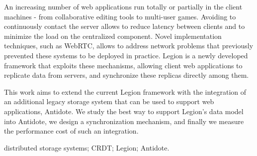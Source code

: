 An increasing number of web applications run totally or partially in the client machines - from collaborative editing tools to multi-user games. Avoiding to continuously contact the server allows to reduce latency between clients and to minimize the load on the centralized component. Novel implementation techniques, such as WebRTC, allows to address network problems that previously prevented these systems to be deployed in practice. Legion is a newly developed framework that exploits these mechanisms, allowing client web applications to replicate data from servers, and synchronize these replicas directly among them.\par
	This work aims to extend the current Legion framework with the integration of an additional legacy storage system that can be used to support web applications, Antidote. We study the best way to support Legion's data model into Antidote, we design a synchronization mechanism, and finally we measure the performance cost of such an integration.
	
\begin{keywords}
distributed storage systems; CRDT; Legion; Antidote.
\end{keywords} 
